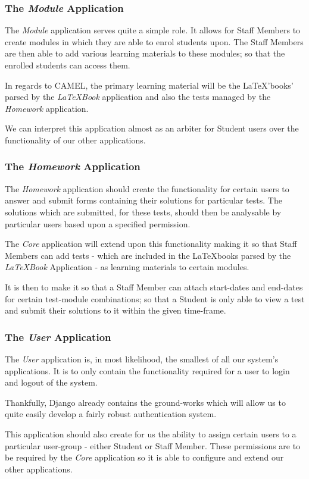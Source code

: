 	\subsubsection*{The \textit{Module} Application}
		The \textit{Module} application serves quite a simple role. It allows for Staff Members to create modules in which they are able to enrol students upon. The Staff Members are then able to add various learning materials to these modules; so that the enrolled students can access them.
		
		In regards to CAMEL, the primary learning material will be the \LaTeX 'books' parsed by the \textit{\LaTeX Book} application and also the tests managed by the \textit{Homework} application.
		
		We can interpret this application almost as an arbiter for Student users over the functionality of our other applications.
		
	
	\subsubsection*{The \textit{Homework} Application}
		The \textit{Homework} application should create the functionality for certain users to answer and submit forms containing their solutions for particular tests. The solutions which are submitted, for these tests, should then be analysable by particular users based upon a specified permission.
		
		The \textit{Core} application will extend upon this functionality making it so that Staff Members can add tests - which are included in the \LaTeX books parsed by the \textit{\LaTeX Book} Application - as learning materials to certain modules.
		
		It is then to make it so that a Staff Member can attach start-dates and end-dates for certain test-module combinations; so that a Student is only able to view a test and submit their solutions to it within the given time-frame.
		
	\subsubsection*{The \textit{User} Application}
		The \textit{User} application is, in most likelihood, the smallest of all our system's applications. It is to only contain the functionality required for a user to login and logout of the system.
		
		Thankfully, Django already contains the ground-works which will allow us to quite easily develop a fairly robust authentication system.
		
		This application should also create for us the ability to assign certain users to a particular user-group - either Student or Staff Member. These permissions are to be required by the \textit{Core} application so it is able to configure and extend our other applications.